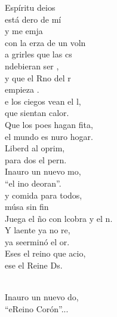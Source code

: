 \documentclass[12pt]{article}
\begin{document}
\begin{multicols*}{2}
\begin{cancion}%
	 Espíritu deios\\
	está dero de mí\\
	y me emja\\
	con la erza de un voln\\
	a grirles que las cs\\
	ndebieran ser , \\
	y que el Rno del r\\
	empieza .\\
	e los ciegos vean el l,\\
	que sientan  calor.\\
	Que los poes hagan fita,\\
	el mundo es nuro hogar.\\
	Liberd al oprim,\\
	para dos el pern.\\
	Inauro un nuevo mo,\\
	“el ino deoran”. \\
	y comida para todos,\\
	músa sin fin\\
	Juega el ño con lcobra y el n. \\
	Y laente ya no re,\\
	ya seerminó el or.\\
	Eses el reino que acio,\\
	ese  el Reine Ds.\\\jump\\
	\begin{chorus}%
	Inauro un nuevo do,\\
	“eReino  Corón”...\\
	\end{chorus}%
	\jump\\
\end{cancion}%


\end{multicols*}
\end{document}
